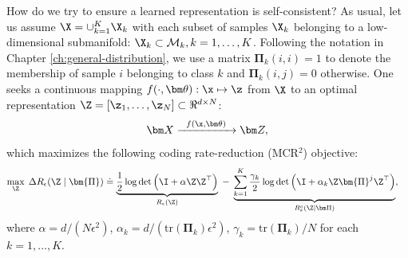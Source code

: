 \documentclass[../../book-main.tex]{subfiles}
\begin{document}
How do we try to ensure a learned representation is self-consistent? As usual, let us assume $\X = \cup_{k=1}^K \X_k$ with each subset of samples $\X_k$ belonging to a low-dimensional submanifold: $\X_k \subset \mathcal{M}_k, k = 1,\ldots, K$. Following the notation in Chapter \ref{ch:general-distribution}, we use a matrix $\bm \Pi_k(i,i) = 1$ to denote the membership of sample $i$ belonging to class $k$ and $\bm \Pi_k(i,j) = 0$ otherwise. One seeks a continuous mapping $f(\cdot,\bm \theta): \x \mapsto \z$ from $\X$ to an optimal representation $\Z = [\z_1, \ldots, \z_N] \subset \Re^{d \times N}$:
\begin{equation}
\bm X  \xrightarrow{\hspace{2mm} f(\x, \bm \theta) \hspace{2mm}} \bm Z, 
\label{eqn:LDR}
\end{equation}
which maximizes the following coding rate-reduction (MCR$^2$) objective:
\begin{equation}\label{eq:mcr2-formulation}
\begin{split}
\max_{\Z} \; \Delta R_\epsilon(\Z  \mid \bm{\Pi}) %
&\doteq \underbrace{\frac{1}{2}\log\det \Big(\I + {\alpha} \Z \Z^\top \Big)}_{R_{\epsilon}(\Z)} \;-\; \underbrace{\sum_{k=1}^{K}\frac{\gamma_k}{2} \log\det\Big(\I + {\alpha_k} \Z \bm{\Pi}^{j} \Z^\top \Big)}_{R^c_{\epsilon}(\Z \mid \bm \Pi)},
\end{split}
\end{equation}
where $\alpha = {d}/({N\epsilon^2})$, $\alpha_k = d/({\mathrm{tr}(\bm{\Pi}_k)\epsilon^2})$, $\gamma_k =  {\mathrm{tr}(\bm{\Pi}_{k})}/{N}$ for each $k = 1,\dots, K$.
\end{document}
